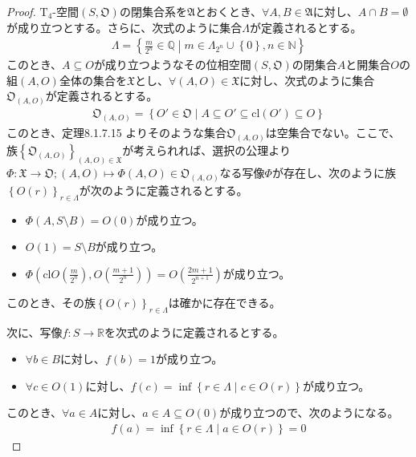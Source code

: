 \documentclass[dvipdfmx]{jsarticle}
\begin{document}
\begin{proof}
$\mathrm{T}_{4}$-空間$\left( S,\mathfrak{O} \right)$の閉集合系を$\mathfrak{A}$とおくとき、$\forall A,B \in \mathfrak{A}$に対し、$A \cap B = \emptyset$が成り立つとする。さらに、次式のように集合$\varLambda$が定義されるとする。
\begin{align*}
\varLambda = \left\{ \frac{m}{2^{n}} \in \mathbb{Q} \middle| m \in \varLambda_{2^{n}} \cup \left\{ 0 \right\},n \in \mathbb{N} \right\}
\end{align*}
このとき、$A \subseteq O$が成り立つようなその位相空間$\left( S,\mathfrak{O} \right)$の閉集合$A$と開集合$O$の組$(A,O)$全体の集合を$\mathfrak{X}$とし、$\forall(A,O)\in \mathfrak{X}$に対し、次式のように集合$\mathfrak{O}_{(A,O)}$が定義されるとする。
\begin{align*}
\mathfrak{O}_{(A,O)} = \left\{ O'\in \mathfrak{O} \middle| A \subseteq O' \subseteq {\mathrm{cl}}\left( O' \right) \subseteq O \right\}
\end{align*}
このとき、定理8.1.7.15
よりそのような集合$\mathfrak{O}_{(A,O)}$は空集合でない。ここで、族$\left\{ \mathfrak{O}_{(A,O)} \right\}_{(A,O)\in \mathfrak{X}}$が考えられれば、選択の公理より$\varPhi:\mathfrak{X \rightarrow O;}(A,O) \mapsto \varPhi(A,O) \in \mathfrak{O}_{(A,O)}$なる写像$\varPhi$が存在し、次のように族$\left\{ O(r) \right\}_{r \in \varLambda}$が次のように定義されるとする。
\begin{itemize}
\item
  $\varPhi(A,S \setminus B) = O(0)$が成り立つ。
\item
  $O(1) = S \setminus B$が成り立つ。
\item
  $\varPhi\left( {\mathrm{cl}}{O\left( \frac{m}{2^{n}} \right)},O\left( \frac{m + 1}{2^{n}} \right) \right) = O\left( \frac{2m + 1}{2^{n + 1}} \right)$が成り立つ。
\end{itemize}
このとき、その族$\left\{ O(r) \right\}_{r \in \varLambda}$は確かに存在できる。\par
次に、写像$f:S \rightarrow \mathbb{R}$を次式のように定義されるとする。
\begin{itemize}
\item
  $\forall b \in B$に対し、$f(b) = 1$が成り立つ。
\item
  $\forall c \in O(1)$に対し、$f(c) = \inf\left\{ r \in \varLambda \middle| c \in O(r) \right\}$が成り立つ。
\end{itemize}
このとき、$\forall a \in A$に対し、$a \in A \subseteq O(0)$が成り立つので、次のようになる。
\begin{align*}
f(a) = \inf\left\{ r \in \varLambda \middle| a \in O(r) \right\} = 0

\end{align*}
\end{proof}
\end{document}
